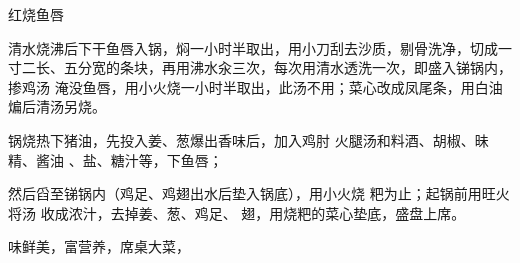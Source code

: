 \begin{recipe}{红烧鱼唇}

\ingredients


\preparation

\step 清水烧沸后下干鱼唇入锅，焖一小时半取出，用小刀刮去沙质，剔骨洗净，切成一
寸二长、五分宽的条块，再用沸水汆三次，每次用清水透洗一次，即盛入锑锅内，掺鸡汤
淹没鱼唇，用小火烧一小时半取出，此汤不用；菜心改成凤尾条，用白油煸后清汤另烧。

锅烧热下猪油，先投入姜、葱爆出香味后，加入鸡肘 火腿汤和料酒、胡椒、昧精、酱油
、盐、糖汁等，下鱼唇；

然后舀至锑锅内（鸡足、鸡翅出水后垫入锅底），用小火烧 粑为止；起锅前用旺火将汤
收成浓汁，去掉姜、葱、鸡足、 翅，用烧粑的菜心垫底，盛盘上席。

\features

味鲜美，富营养，席桌大菜，

\end{recipe}

